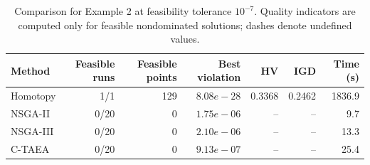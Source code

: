 \begin{table}[htbp]
\centering
\caption{Comparison for Example 2 at feasibility tolerance $10^{-7}$. Quality indicators are computed only for feasible nondominated solutions; dashes denote undefined values.}
\label{tab:example2_comparison}
\small
\begin{tabular}{lrrrrrr}
\toprule
Method & Feasible runs & Feasible points & Best violation & HV & IGD & Time (s) \\
\midrule
Homotopy & 1/1 & 129 & $8.08e-28$ & 0.3368 & 0.2462 & 1836.9 \\
NSGA-II & 0/20 & 0 & $1.75e-06$ & -- & -- & 9.7 \\
NSGA-III & 0/20 & 0 & $2.10e-06$ & -- & -- & 13.3 \\
C-TAEA & 0/20 & 0 & $9.13e-07$ & -- & -- & 25.4 \\
\bottomrule
\end{tabular}
\end{table}
